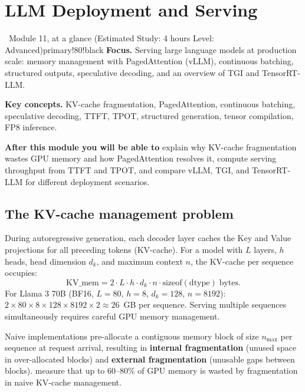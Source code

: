 \documentclass[11pt,a4paper]{article}
\begin{document}
	\clearpage
	\section{LLM Deployment and Serving}
	\label{sec:deployment}

	\begin{modulecard}{\faRocket\ Module 11, at a glance \hfill \small\normalfont (Estimated Study: 4 hours \textbullet{} Level: Advanced)}{primary!80!black}
		\textbf{Focus.} Serving large language models at production scale: memory management with PagedAttention (vLLM), continuous batching, structured outputs, speculative decoding, and an overview of TGI and TensorRT-LLM.

		\medskip
		\textbf{Key concepts.} KV-cache fragmentation, PagedAttention, continuous batching, speculative decoding, TTFT, TPOT, structured generation, tensor compilation, FP8 inference.

		\medskip
		\textbf{After this module you will be able to} explain why KV-cache fragmentation wastes GPU memory and how PagedAttention resolves it, compute serving throughput from TTFT and TPOT, and compare vLLM, TGI, and TensorRT-LLM for different deployment scenarios.
	\end{modulecard}

	\subsection{The KV-cache management problem}

	During autoregressive generation, each decoder layer caches the Key and Value projections for all preceding tokens (KV-cache). For a model with $L$ layers, $h$ heads, head dimension $d_k$, and maximum context $n$, the KV-cache per sequence occupies:
	\begin{equation}
		\mathrm{KV\_mem} = 2 \cdot L \cdot h \cdot d_k \cdot n \cdot \mathrm{sizeof}(\mathrm{dtype})\;\text{bytes}.
	\end{equation}
	For Llama 3 70B (BF16, $L=80$, $h=8$, $d_k=128$, $n=8192$): $2 \times 80 \times 8 \times 128 \times 8192 \times 2 \approx 26$~GB per sequence. Serving multiple sequences simultaneously requires careful GPU memory management.

	Naive implementations pre-allocate a contiguous memory block of size $n_{\max}$ per sequence at request arrival, resulting in \textbf{internal fragmentation} (unused space in over-allocated blocks) and \textbf{external fragmentation} (unusable gaps between blocks). \textcite{kwon2023vllm} measure that up to 60--80\% of GPU memory is wasted by fragmentation in naive KV-cache management.
\end{document}
